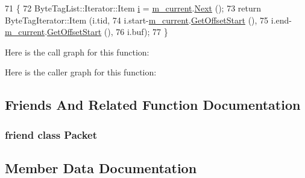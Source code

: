 \begin{DoxyCode}
71 \{
72   ByteTagList::Iterator::Item \hyperlink{bernuolliDistribution_8m_a6f6ccfcf58b31cb6412107d9d5281426}{i} = \hyperlink{classns3_1_1ByteTagIterator_af270ce56fb3f7f04082645de35fa7dc6}{m\_current}.\hyperlink{classns3_1_1ByteTagList_1_1Iterator_af521864d800baab1d9c5262f59ce4433}{Next} ();
73   \textcolor{keywordflow}{return} ByteTagIterator::Item (i.tid,
74                                 i.start-\hyperlink{classns3_1_1ByteTagIterator_af270ce56fb3f7f04082645de35fa7dc6}{m\_current}.\hyperlink{classns3_1_1ByteTagList_1_1Iterator_a3dbfd8531dac30a62afb37317937d974}{GetOffsetStart} (),
75                                 i.end-\hyperlink{classns3_1_1ByteTagIterator_af270ce56fb3f7f04082645de35fa7dc6}{m\_current}.\hyperlink{classns3_1_1ByteTagList_1_1Iterator_a3dbfd8531dac30a62afb37317937d974}{GetOffsetStart} (),
76                                 i.buf);
77 \}
\end{DoxyCode}


Here is the call graph for this function\+:




Here is the caller graph for this function\+:




\subsection{Friends And Related Function Documentation}
\subsubsection[{\texorpdfstring{Packet}{Packet}}]{\setlength{\rightskip}{0pt plus 5cm}friend class {\bf Packet}\hspace{0.3cm}{\ttfamily [friend]}}\hypertarget{classns3_1_1ByteTagIterator_ae51cb555166657e5996a76768db998e3}{}\label{classns3_1_1ByteTagIterator_ae51cb555166657e5996a76768db998e3}


\subsection{Member Data Documentation}
